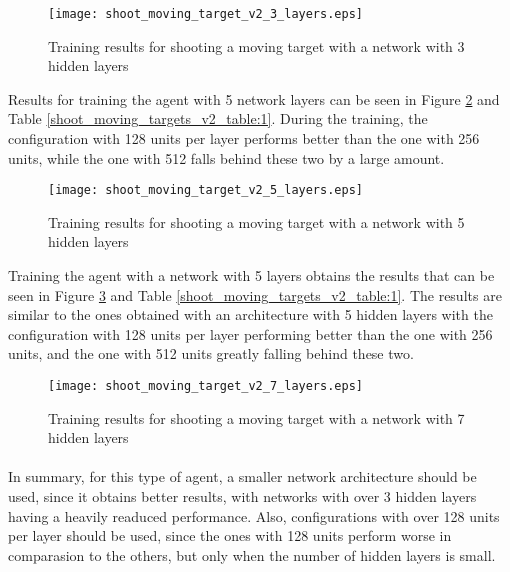 \begin{figure}
    \begin{center}
        \texttt{[image: shoot\_moving\_target\_v2\_3\_layers.eps]}
        \caption{Training results for shooting a moving target with a network with 3 hidden layers}
        \label{train_results_shoot_v2_3_layers}
    \end{center}
\end{figure}

Results for training the agent with 5 network layers can be seen in Figure \ref{train_results_shoot_v2_5_layers} and Table \ref{shoot_moving_targets_v2_table:1}. During the training, the configuration with 128 units per layer performs better than the one with 256 units, while the one with 512 falls behind these two by a large amount.

\begin{figure}
    \begin{center}
        \texttt{[image: shoot\_moving\_target\_v2\_5\_layers.eps]}
        \caption{Training results for shooting a moving target with a network with 5 hidden layers}
        \label{train_results_shoot_v2_5_layers}
    \end{center}
\end{figure}

Training the agent with a network with 5 layers obtains the results that can be seen in Figure \ref{train_results_shoot_v2_7_layers} and Table \ref{shoot_moving_targets_v2_table:1}. The results are similar to the ones obtained with an architecture with 5 hidden layers with the configuration with 128 units per layer performing better than the one with 256 units, and the one with 512 units greatly falling behind these two.

\begin{figure}
    \begin{center}
        \texttt{[image: shoot\_moving\_target\_v2\_7\_layers.eps]}
        \caption{Training results for shooting a moving target with a network with 7 hidden layers}
        \label{train_results_shoot_v2_7_layers}
    \end{center}
\end{figure}


\paragraph{}
In summary, for this type of agent, a smaller network architecture should be used, since it obtains better results, with networks with over 3 hidden layers having a heavily readuced performance. Also, configurations with over 128 units per layer should be used, since the ones with 128 units perform worse in comparasion to the others, but only when the number of hidden layers is small.


